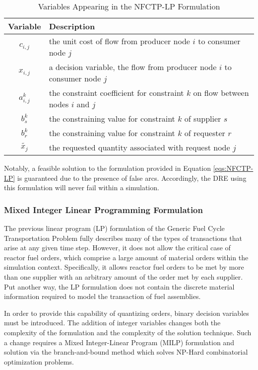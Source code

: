 \begin{table} [h!]
\centering
\begin{tabularx}{\columnwidth-10pt}{|c|X|} %
\hline
Variable    & Description \\
\hline
$c_{i,j}$             & the unit cost of flow
                          from producer node $i$ to consumer node $j$  \\
$x_{i,j}$             & a decision variable, the flow 
                          from producer node $i$ to consumer node $j$  \\
$a_{i,j}^k$ & the constraint coefficient for constraint $k$ 
                          on flow between nodes $i$ and $j$  \\
$b_s^k$   & the constraining value for constraint $k$ of supplier $s$ \\
$b_r^k$   & the constraining value for constraint $k$ of requester $r$ \\
$\tilde{x_j}$ & the requested quantity associated with request node $j$ \\
\hline
\end{tabularx}
\caption{Variables Appearing in the NFCTP-LP Formulation}
\label{tbl:NFCTP-LP-vars}
\end{table}

Notably, a feasible solution to the formulation provided in Equation
\ref{eqs:NFCTP-LP} is guaranteed due to the presence of false arcs. Accordingly,
the DRE using this formulation will never fail within a simulation.

\subsubsection{Mixed Integer Linear Programming Formulation}\label{abm:dre:milp}

The previous linear program (LP) formulation of the Generic Fuel Cycle
Transportation Problem fully describes many of the types of transactions that
arise at any given time step. However, it does not allow the critical case of
reactor fuel orders, which comprise a large amount of material orders within the
simulation context. Specifically, it allows reactor fuel orders to be met by
more than one supplier with an arbitrary amount of the order met by each
supplier. Put another way, the LP formulation does not contain the discrete
material information required to model the transaction of fuel assemblies. 

In order to provide this capability of quantizing orders, binary decision
variables must be introduced. The addition of integer variables changes both the
complexity of the formulation and the complexity of the solution technique. Such
a change requires a Mixed Integer-Linear Program (MILP) formulation and solution
via the branch-and-bound method which solves NP-Hard combinatorial optimization
problems.

